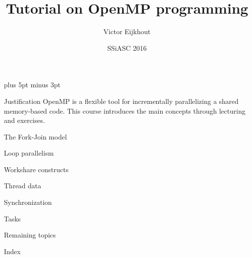\documentclass[11pt,headernav]{beamer}
\begin{document}
\parskip=10pt plus 5pt minus 3pt

\title{Tutorial on OpenMP programming}
\author{Victor Eijkhout}
\date{SSiASC 2016}

\begin{frame}
  \titlepage
\end{frame}

\begin{frame}{Justification}
  OpenMP is a flexible tool for incrementally parallelizing a shared
  memory-based code.
  This course introduces the main concepts
  through lecturing and exercises.
\end{frame}

 {The Fork-Join model}


 {Loop parallelism}


 {Workshare constructs}


 {Thread data}


 {Synchronization}


 {Tasks}


 {Remaining topics}


\newenvironment
    {theindex}
    {\begin{itemize}\setlength\itemsep{0pt}\baselineskip=8pt}
    {\end{itemize}}
\let\indexspace\par
\def\subitem{\par\indent}
%
\begin{frame}{Index}
\small
\begin{multicols}{2}
\printindex  
\end{multicols}
\end{frame}
\end{document}
